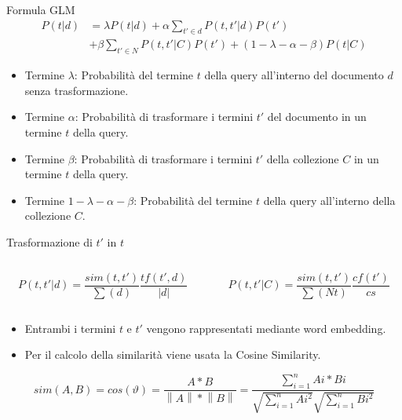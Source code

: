\begin{frame}{Formula GLM}
    \setlength{\abovedisplayskip}{1pt}
    \setlength{\belowdisplayskip}{1pt}
    \[
        \begin{split}
            P(t|d) & = \lambda P(t|d) + \alpha \sum_{{t}'\in d}P(t,{t}'|d)P({t}')\\
            & + \beta \sum_{{t}'\in N}P(t,{t}'|C)P({t}') + (1-\lambda-\alpha-\beta)P(t|C)
        \end{split}
    \]
    \begin{itemize}
        \item Termine \(\lambda\): Probabilità del termine \(t\) della query all'interno del documento \(d\) senza trasformazione.
        \item Termine \(\alpha\): Probabilità di trasformare i termini \({t}'\) del documento in un termine \(t\) della query.
        \item Termine \(\beta\): Probabilità di trasformare i termini \({t}'\) della collezione \(C\) in un termine \(t\) della query.
        \item Termine \(1-\lambda-\alpha-\beta\): Probabilità del termine \(t\) della query all'interno della collezione \(C\).
    \end{itemize}
\end{frame}

\begin{frame}{Trasformazione di \({t}'\) in \(t\)}

    \begin{columns}
        \begin{column}{0.5\textwidth}
            \[P(t,t'|d) = \frac{sim(t,t')}{\sum (d)}\frac{tf(t',d)}{|d|}\]
        \end{column}
        \begin{column}{0.5\textwidth}
            \[P(t,t'|C) = \frac{sim(t,t')}{\sum (Nt)}\frac{cf(t')}{cs}\]
        \end{column}
    \end{columns}

    \bigskip
    \begin{itemize}
        \item Entrambi i termini \(t\) e \({t}'\) vengono rappresentati mediante word embedding.
        \item Per il calcolo della similarità viene usata la Cosine Similarity.
    \end{itemize}

    \[sim(A,B) = cos(\vartheta ) = \frac{A * B}{\left \| A \right \| * \left \| B \right \|} = \frac{\sum_{i=1}^{n} Ai * Bi}{\sqrt{\sum_{i=1}^{n}Ai^{2}}\sqrt{\sum_{i=1}^{n}Bi^{2}}}\]

\end{frame}

